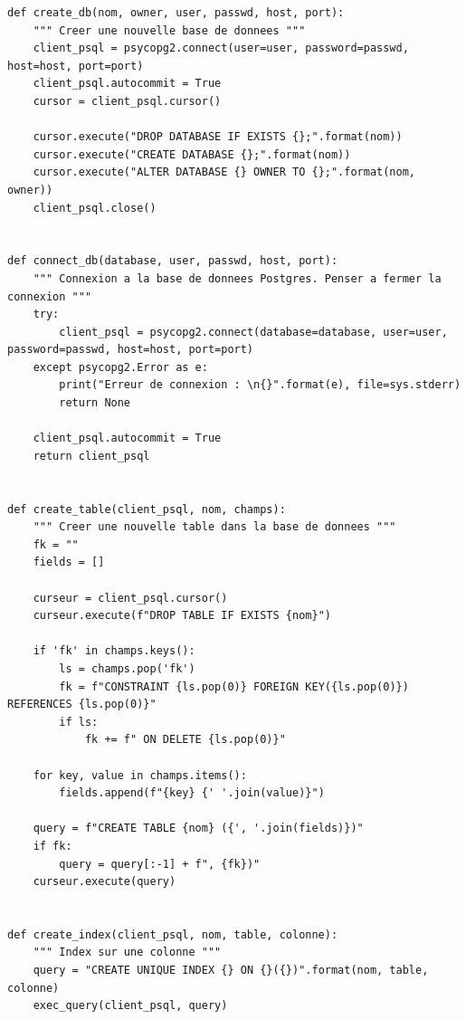 \documentclass[a4paper,12pt]{article}
\begin{document}
			\begin{lstlisting}[title=Fonctions utiles]
def create_db(nom, owner, user, passwd, host, port):
    """ Creer une nouvelle base de donnees """
    client_psql = psycopg2.connect(user=user, password=passwd, host=host, port=port)
    client_psql.autocommit = True
    cursor = client_psql.cursor()

    cursor.execute("DROP DATABASE IF EXISTS {};".format(nom))
    cursor.execute("CREATE DATABASE {};".format(nom))
    cursor.execute("ALTER DATABASE {} OWNER TO {};".format(nom, owner))
    client_psql.close()


def connect_db(database, user, passwd, host, port):
    """ Connexion a la base de donnees Postgres. Penser a fermer la connexion """
    try:
        client_psql = psycopg2.connect(database=database, user=user, password=passwd, host=host, port=port)
    except psycopg2.Error as e:
        print("Erreur de connexion : \n{}".format(e), file=sys.stderr)
        return None

    client_psql.autocommit = True
    return client_psql


def create_table(client_psql, nom, champs):
    """ Creer une nouvelle table dans la base de donnees """
    fk = ""
    fields = []

    curseur = client_psql.cursor()
    curseur.execute(f"DROP TABLE IF EXISTS {nom}")

    if 'fk' in champs.keys():
        ls = champs.pop('fk')
        fk = f"CONSTRAINT {ls.pop(0)} FOREIGN KEY({ls.pop(0)}) REFERENCES {ls.pop(0)}"
        if ls:
            fk += f" ON DELETE {ls.pop(0)}"

    for key, value in champs.items():
        fields.append(f"{key} {' '.join(value)}")

    query = f"CREATE TABLE {nom} ({', '.join(fields)})"
    if fk:
        query = query[:-1] + f", {fk})"
    curseur.execute(query)


def create_index(client_psql, nom, table, colonne):
    """ Index sur une colonne """
    query = "CREATE UNIQUE INDEX {} ON {}({})".format(nom, table, colonne)
    exec_query(client_psql, query)
			\end{lstlisting}
				

\newpage
\end{document}
